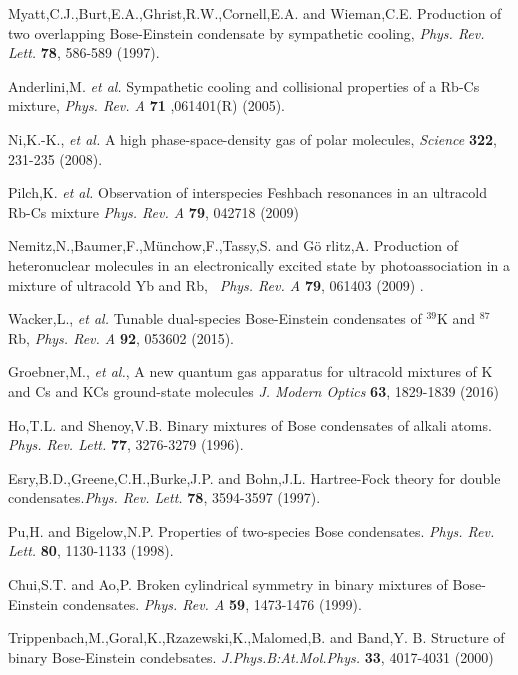 \documentclass[single-column,showpacs,groupedaddress]{revtex4}
\begin{document}
\begin{thebibliography}{99}
 Myatt,C.J.,Burt,E.A.,Ghrist,R.W.,Cornell,E.A. and
Wieman,C.E. Production of two overlapping Bose-Einstein condensate by
sympathetic cooling, \textit{Phys. Rev. Lett.} \textbf{78}, 586-589 (1997).

 Anderlini,M. \textit{et al.} Sympathetic cooling and
collisional properties of a Rb-Cs mixture, \textit{Phys. Rev. A} \textbf{71 }%
,061401(R) (2005).

 Ni,K.-K., \textit{et al.} A high phase-space-density gas of
polar molecules, \textit{Science} \textbf{322}, 231-235 (2008).

 Pilch,K. \textit{et al.} Observation of interspecies
Feshbach resonances in an ultracold Rb-Cs mixture \textit{Phys. Rev. A }%
\textbf{79}, 042718 (2009)

 Nemitz,N.,Baumer,F.,M\"{u}nchow,F.,Tassy,S. and G\"{o}%
rlitz,A. Production of heteronuclear molecules in an electronically excited
state by photoassociation in a mixture of ultracold Yb and Rb, \textit{\
Phys. Rev. A} \textbf{79}, 061403 (2009) .

 Wacker,L., \textit{et al.} Tunable dual-species
Bose-Einstein condensates of $^{39}$K and $^{87}$Rb, \textit{Phys. Rev. A}
\textbf{92}, 053602 (2015).

 Groebner,M., \textit{et al.}, A new quantum gas apparatus for
ultracold mixtures of K and Cs and KCs ground-state molecules \textit{J.
Modern Optics} \textbf{63}, 1829-1839 (2016)

 Ho,T.L. and Shenoy,V.B. Binary mixtures of Bose condensates
of alkali atoms. \textit{Phys. Rev. Lett.} \textbf{77}, 3276-3279 (1996).

 Esry,B.D.,Greene,C.H.,Burke,J.P. and Bohn,J.L. Hartree-Fock
theory for double condensates.\textit{Phys. Rev. Lett.} \textbf{78},
3594-3597 (1997).

 Pu,H. and Bigelow,N.P. Properties of two-species Bose
condensates. \textit{Phys. Rev. Lett.} \textbf{80}, 1130-1133 (1998).

 Chui,S.T. and Ao,P. Broken cylindrical symmetry in binary
mixtures of Bose-Einstein condensates. \textit{Phys. Rev. A} \textbf{59},
1473-1476 (1999).

 Trippenbach,M.,Goral,K.,Rzazewski,K.,Malomed,B. and
Band,Y. B. Structure of binary Bose-Einstein condebsates. \textit{%
J.Phys.B:At.Mol.Phys.} \textbf{33}, 4017-4031 (2000)


\end{thebibliography}
\end{document}
